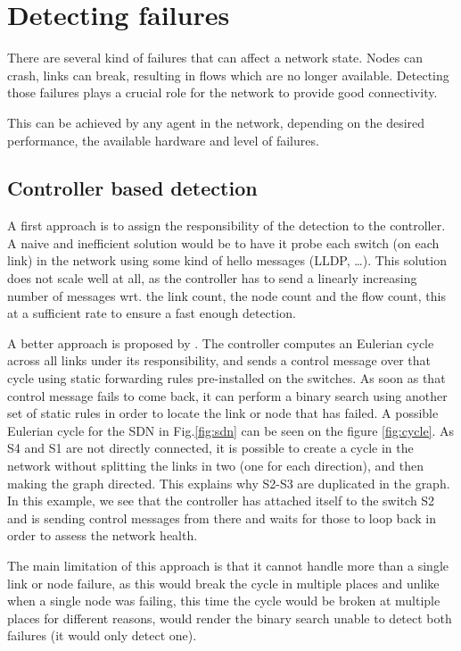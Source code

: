 \documentclass[]{IEEEtran}
\begin{document}
\section{Detecting failures}
There are several kind of failures that can affect a network state. Nodes can crash, links can break, resulting in flows which are no longer available. Detecting those failures plays a crucial role for the network to provide good connectivity.

This can be achieved by any agent in the network, depending on the desired performance, the available hardware and level of failures.

\subsection{Controller based detection}
A first approach is to assign the responsibility of the detection to the controller. A naive and inefficient solution would be to have it probe each switch (on each link) in the network using some kind of hello messages (LLDP\cite{5409813}, \ldots). This solution does not scale well at all\cite{6364688}, as the controller has to send a linearly increasing number of messages wrt. the link count, the node count and the flow count, this at a sufficient rate to ensure a fast enough detection.

A better approach is proposed by \cite{2013arXiv1308.4465K}. The controller computes an Eulerian cycle across all links under its responsibility, and sends a control message over that cycle using static forwarding rules pre-installed on the switches. As soon as that control message fails to come back, it can perform a binary search using another set of static rules in order to locate the link or node that has failed. A possible Eulerian cycle for the SDN in Fig.\ref{fig:sdn} can be seen on the figure \ref{fig:cycle}. As S4 and S1 are not directly connected, it is possible to create a cycle in the network without splitting the links in two (one for each direction), and then making the graph directed. This explains why S2-S3 are duplicated in the graph. In this example, we see that the controller has attached itself to the switch S2 and is sending control messages from there and waits for those to loop back in order to assess the network health.

The main limitation of this approach is that it cannot handle more than a single link or node failure, as this would break the cycle in multiple places and unlike when a single node was failing, this time the cycle would be broken at multiple places for different reasons, would render the binary search unable to detect both failures (it would only detect one).
\end{document}
